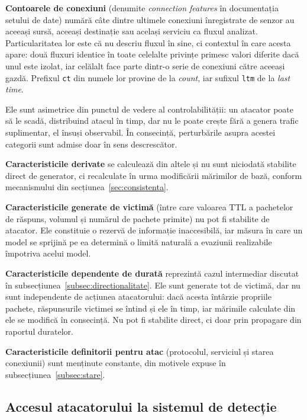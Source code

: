 \textbf{Contoarele de conexiuni} (denumite \textit{connection features} în documentația setului de date) numără câte dintre ultimele conexiuni înregistrate de senzor au aceeași sursă, aceeași destinație sau același serviciu ca fluxul analizat. Particularitatea lor este că nu descriu fluxul în sine, ci contextul în care acesta apare: două fluxuri identice în toate celelalte privințe primesc valori diferite dacă unul este izolat, iar celălalt face parte dintr-o serie de conexiuni către aceeași gazdă. Prefixul \verb|ct| din numele lor provine de la \textit{count}, iar sufixul \verb|ltm| de la \textit{last time}.

Ele sunt asimetrice din punctul de vedere al controlabilității: un atacator poate să le scadă, distribuind atacul în timp, dar nu le poate crește fără a genera trafic suplimentar, el însuși observabil. În consecință, perturbările asupra acestei categorii sunt admise doar în sens descrescător.

\textbf{Caracteristicile derivate} se calculează din altele și nu sunt niciodată stabilite direct de generator, ci recalculate în urma modificării mărimilor de bază, conform mecanismului din secțiunea~\ref{sec:consistenta}.

\textbf{Caracteristicile generate de victimă} (între care valoarea TTL a pachetelor de răspuns, volumul și numărul de pachete primite) nu pot fi stabilite de atacator. Ele constituie o rezervă de informație inaccesibilă, iar măsura în care un model se sprijină pe ea determină o limită naturală a evaziunii realizabile împotriva acelui model.

\textbf{Caracteristicile dependente de durată} reprezintă cazul intermediar discutat în subsecțiunea~\ref{subsec:directionalitate}. Ele sunt generate tot de victimă, dar nu sunt independente de acțiunea atacatorului: dacă acesta întârzie propriile pachete, răspunsurile victimei se întind și ele în timp, iar mărimile calculate din ele se modifică în consecință. Nu pot fi stabilite direct, ci doar prin propagare din raportul duratelor.

\textbf{Caracteristicile definitorii pentru atac} (protocolul, serviciul și starea conexiunii) sunt menținute constante, din motivele expuse în subsecțiunea~\ref{subsec:stare}.

\subsection{Accesul atacatorului la sistemul de detecție}\label{subsec:acces}

